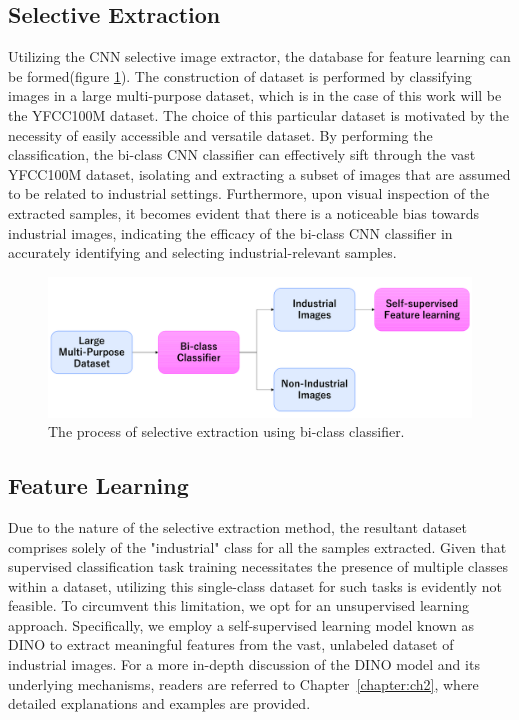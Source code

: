 \subsection{Selective Extraction}
\label{cnn selective extraction}
Utilizing the CNN selective image extractor, the database for feature learning can be formed(figure \ref{fig:cnn_extraction}). The construction of dataset is performed by classifying images in a large multi-purpose dataset, which is in the case of this work will be the YFCC100M\cite{yfcc100m} dataset. The choice of this particular dataset is motivated by the necessity of easily accessible and versatile dataset. By performing the classification, the bi-class CNN classifier can effectively sift through the vast YFCC100M dataset, isolating and extracting a subset of images that are assumed to be related to industrial settings. Furthermore, upon visual inspection of the extracted samples, it becomes evident that there is a noticeable bias towards industrial images, indicating the efficacy of the bi-class CNN classifier in accurately identifying and selecting industrial-relevant samples.

\begin{figure}[h!]
	\begin{center}
		\includegraphics[width=1.0\linewidth]{Chapter_3/cnn_extraction.png}
	\end{center}
	\caption{The process of selective extraction using bi-class classifier.}
	\label{fig:cnn_extraction}
\end{figure} 	

\subsection{Feature Learning}
\label{feature learning cnn}
Due to the nature of the selective extraction method, the resultant dataset comprises solely of the "industrial" class for all the samples extracted. Given that supervised classification task training necessitates the presence of multiple classes within a dataset, utilizing this single-class dataset for such tasks is evidently not feasible. To circumvent this limitation, we opt for an unsupervised learning approach. Specifically, we employ a self-supervised learning model known as DINO\cite{dino} to extract meaningful features from the vast, unlabeled dataset of industrial images. For a more in-depth discussion of the DINO model and its underlying mechanisms, readers are referred to Chapter~\ref{chapter:ch2}, where detailed explanations and examples are provided.

